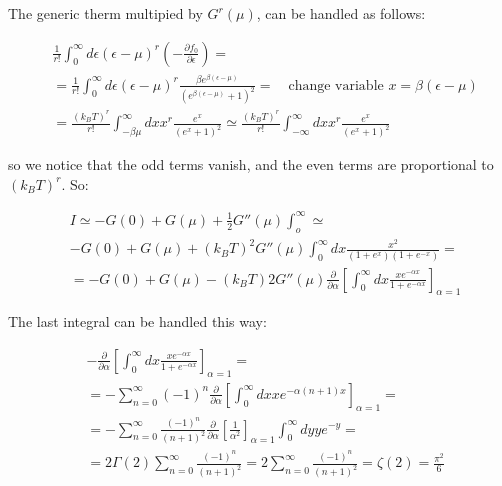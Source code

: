 \documentclass{article}
\begin{document}
The generic therm multipied by $G^r(\mu)$, can be handled as follows:

\begin{equation}
    \begin{aligned}
         & \frac{1}{r!}\int_0^\infty d\epsilon(\epsilon-\mu)^r\left( -\frac{\partial f_0}{\partial \epsilon} \right)=                                                                      \\
         & = \frac{1}{r!}\int_0^\infty d\epsilon (\epsilon-\mu)^r\frac{\beta e^{\beta(\epsilon-\mu)}}{(e^{\beta(\epsilon-\mu)}+1)^2}= \quad \text{change variable $x=\beta(\epsilon-\mu)$} \\
         & = \frac{(k_BT)^r}{r!}\int_{-\beta\mu}^\infty dx x^r\frac{e^x}{(e^x+1)^2}\simeq \frac{(k_BT)^r}{r!}\int_{-\infty}^\infty dx x^r\frac{e^x}{(e^x+1)^2}
    \end{aligned}
\end{equation}

so we notice that the odd terms vanish, and the even terms are proportional to $(k_BT)^r$.
So:

\begin{equation}
    \begin{aligned}
         & I\simeq -G(0)+G(\mu)+\frac{1}{2}G''(\mu)\int_o^\infty \simeq                                                                                 \\
         & -G(0)+G(\mu)+(k_BT)^2G''(\mu)\int_0^\infty dx \frac{x^2}{(1+e^x)(1+e^{-x})}=                                                                 \\
         & =-G(0)+G(\mu)-(k_BT)2G''(\mu)\frac{\partial}{\partial \alpha}\left[\int_0^\infty dx \frac{xe^{-\alpha x}}{1+e^{-\alpha x}}\right]_{\alpha=1}
    \end{aligned}
\end{equation}

The last integral can be handled this way:

\begin{equation}
    \begin{aligned}
         & -\frac{\partial}{\partial \alpha}\left[\int_0^\infty dx \frac{xe^{-\alpha x}}{1+e^{-\alpha x}}\right]_{\alpha=1}=                               \\
         & =-\sum_{n=0}^ \infty (-1)^n\frac{\partial}{\partial \alpha}\left[ \int_0^\infty dx x e^{-\alpha(n+1)x} \right]_{\alpha=1}=                      \\
         & =-\sum_{n=0}^\infty \frac{(-1)^n}{(n+1)^2}\frac{\partial}{\partial \alpha}\left[\frac{1}{\alpha^2} \right]_{\alpha=1}\int_0^\infty dy y e^{-y}= \\
         & = 2\Gamma(2)\sum_{n=0}^\infty \frac{(-1)^n}{(n+1)^2}=2\sum_{n=0}^\infty \frac{(-1)^n}{(n+1)^2}=\zeta(2)=\frac{\pi^2}{6}
    \end{aligned}
\end{equation}
\end{document}
